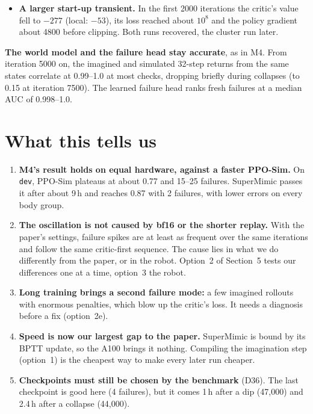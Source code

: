 \documentclass[10pt]{article}
\begin{document}
\begin{itemize}
  penalty terms of the reward are unbounded (action rate and joint limits), so a few rollouts' actions or
  predicted joints must leave the data. Our logs don't say which. Both bursts fall within the
  benchmark's dips at 35,000--36,000 and 47,000. The local run shows none of this (critic loss at most 15
  after iteration 3000, imagined reward never below $-0.1$).
  \item \textbf{A larger start-up transient.} In the first 2000 iterations the critic's value fell to
  $-277$ (local: $-53$), its loss reached about $10^8$ and the policy gradient about 4800 before
  clipping. Both runs recovered, the cluster run later.
\end{itemize}

\textbf{The world model and the failure head stay accurate}, as in M4. From iteration 5000 on, the imagined and
simulated 32-step returns from the same states correlate at 0.99--1.0 at most checks, dropping briefly
during collapses (to 0.15 at iteration 7500). The learned failure head ranks fresh failures at a median
AUC of 0.998--1.0.

\section{What this tells us}

\begin{enumerate}
  \item \textbf{M4's result holds on equal hardware, against a faster PPO-Sim.} On \texttt{dev},
  PPO-Sim plateaus at about 0.77 and 15--25 failures. SuperMimic passes it after about 9\,h and reaches
  0.87 with 2 failures, with lower errors on every body group.
  \item \textbf{The oscillation is not caused by bf16 or the shorter replay.} With the paper's settings,
  failure spikes are at least as frequent over the same iterations and follow the same critic-first sequence. The
  cause lies in what we do differently from the paper, or in the robot. Option~2 of Section~5 tests our
  differences one at a time, option~3 the robot.
  \item \textbf{Long training brings a second failure mode:} a few imagined rollouts with enormous
  penalties, which blow up the critic's loss. It needs a diagnosis before a fix (option~2e).
  \item \textbf{Speed is now our largest gap to the paper.} SuperMimic is bound by its BPTT update, so
  the A100 brings it nothing. Compiling the imagination step (option~1) is the cheapest way to make every
  later run cheaper.
  \item \textbf{Checkpoints must still be chosen by the benchmark} (D36). The last checkpoint is good
  here (4 failures), but it comes 1\,h after a dip (47,000) and 2.4\,h after a collapse (44,000).
\end{enumerate}
\end{document}
